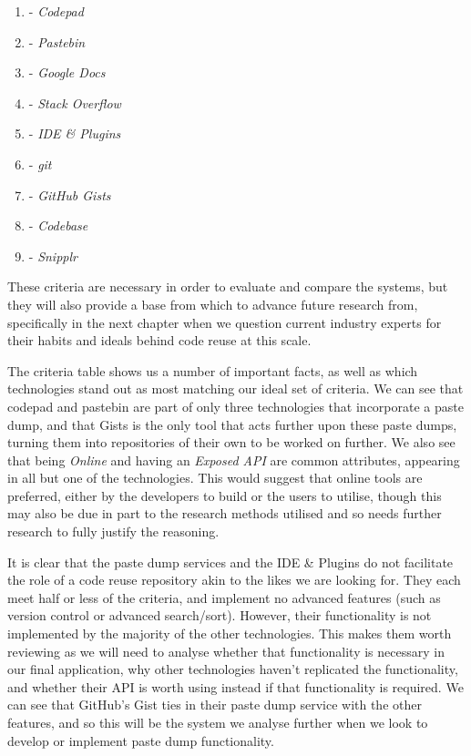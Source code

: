 \begin{enumerate}[label=\Alph*]
\item - \textit{Codepad}
\item - \textit{Pastebin}
\item - \textit{Google Docs}
\item - \textit{Stack Overflow}
\item - \textit{IDE \& Plugins}
\item - \textit{git}
\item - \textit{GitHub Gists}
\item - \textit{Codebase}
\item - \textit{Snipplr}
\end{enumerate}


These criteria are necessary in order to evaluate and compare the systems, but they will also provide a base from which to advance future research from, specifically in the next chapter when we question current industry experts for their habits and ideals behind code reuse at this scale. 

The criteria table shows us a number of important facts, as well as which technologies stand out as most matching our ideal set of criteria. We can see that codepad and pastebin are part of only three technologies that incorporate a paste dump, and that Gists is the only tool that acts further upon these paste dumps, turning them into repositories of their own to be worked on further. We also see that being \textit{Online} and having an \textit{Exposed API} are common attributes, appearing in all but one of the technologies. This would suggest that online tools are preferred, either by the developers to build or the users to utilise, though this may also be due in part to the research methods utilised and so needs further research to fully justify the reasoning.

It is clear that the paste dump services and the IDE \& Plugins do not facilitate the role of a code reuse repository akin to the likes we are looking for. They each meet half or less of the criteria, and implement no advanced features (such as version control or advanced search/sort). However, their functionality is not implemented by the majority of the other technologies. This makes them worth reviewing as we will need to analyse whether that functionality is necessary in our final application, why other technologies haven't replicated the functionality, and whether their API is worth using instead if that functionality is required. We can see that GitHub's Gist ties in their paste dump service with the other features, and so this will be the system we analyse further when we look to develop or implement paste dump functionality.

